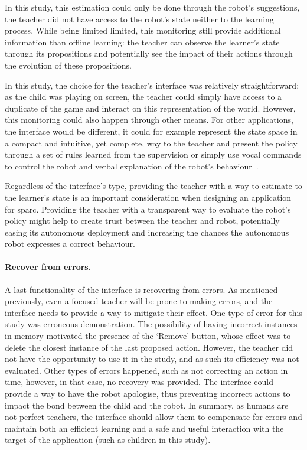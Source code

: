 In this study, this estimation could only be done through the robot's suggestions, the teacher did not have access to the robot's state neither to the learning process. While being limited limited, this monitoring still provide additional information than offline learning: the teacher can observe the learner's state through its propositions and potentially see the impact of their actions through the evolution of these propositions.

In this study, the choice for the teacher's interface was relatively straightforward: as the child was playing on screen, the teacher could simply have access to a duplicate of the game and interact on this representation of the world. However, this monitoring could also happen through other means. For other applications, the interface would be different, it could for example represent the state space in a compact and intuitive, yet complete, way to the teacher and present the policy through a set of rules learned from the supervision or simply use vocal commands to control the robot and verbal explanation of the robot's behaviour~\citep{hayes2017improving}.

Regardless of the interface's type, providing the teacher with a way to estimate to the learner's state is an important consideration when designing an application for \gls{sparc}. Providing the teacher with a transparent way to evaluate the robot's policy might help to create trust between the teacher and robot, potentially easing its autonomous deployment and increasing the chances the autonomous robot expresses a correct behaviour.

\paragraph{Recover from errors.}

A last functionality of the interface is recovering from errors. As mentioned previously, even a focused teacher will be prone to making errors, and the interface needs to provide a way to mitigate their effect. One type of error for this study was erroneous demonstration. The possibility of having incorrect instances in memory motivated the presence of the `Remove' button, whose effect was to delete the closest instance of the last proposed action. However, the teacher did not have the opportunity to use it in the study, and as such its efficiency was not evaluated. Other types of errors happened, such as not correcting an action in time, however, in that case, no recovery was provided. The interface could provide a way to have the robot apologise, thus preventing incorrect actions to impact the bond between the child and the robot. In summary, as humans are not perfect teachers, the interface should allow them to compensate for errors and maintain both an efficient learning and a safe and useful interaction with the target of the application (such as children in this study).

